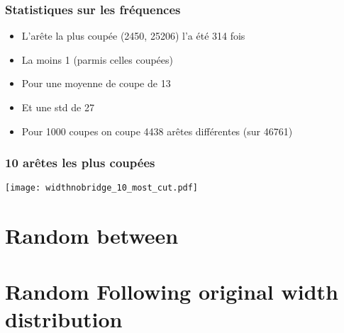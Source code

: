\documentclass[aspectratio=169]{beamer}
\begin{document}
    \begin{frame}
        \frametitle{Statistiques sur les fréquences}
        
        \begin{itemize}
            \item L'arête la plus coupée (2450, 25206) l'a été 314 fois
            \item La moins 1 (parmis celles coupées)
            \item Pour une moyenne de coupe de 13
            \item Et une std de 27
            \item Pour 1000 coupes on coupe 4438 arêtes différentes (sur 46761)
        \end{itemize}
    
    \end{frame}

    \begin{frame}
        \frametitle{10 arêtes les plus coupées}
        \centering
        \texttt{[image: widthnobridge\_10\_most\_cut.pdf]}
    \end{frame}
    \section{Random between}

    \section{Random Following original width distribution}
\end{document}
